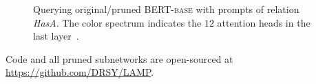 \begin{figure}[t]
	\centering
	\caption{Querying original/pruned \textsc{BERT-base} with prompts of relation \textit{HasA}. The color spectrum indicates the $12$ attention heads in the last layer~\citep{DBLP:journals/corr/abs-1904-02679}.} \label{fig:LAMA}
\end{figure}



Code and all pruned subnetworks are open-sourced at \url{https://github.com/DRSY/LAMP}.
